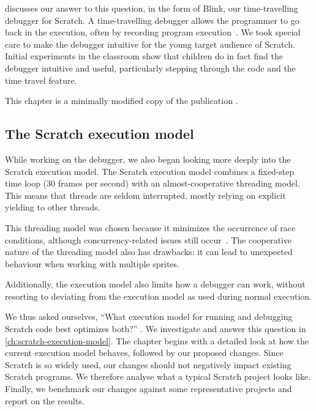 \documentclass[../main]{subfiles}
\begin{document}
 discusses our answer to this question, in the form of Blink, our time-travelling debugger for Scratch.
A time-travelling debugger allows the programmer to go back in the execution, often by recording program execution~\autocite{barrTardisAffordableTimetravel2014,barrTimetravelDebuggingJavaScript2016,czaplickiAsynchronousFunctionalReactive2013,balzerEXDAMSExtendableDebugging1969,ungarDebuggingExperienceImmediacy1997,chenReversibleDebuggingUsing2001,crescenziReversibleExecutionVisualization2000}.
We took special care to make the debugger intuitive for the young target audience of Scratch.
Initial experiments in the classroom show that children do in fact find the debugger intuitive and useful, particularly stepping through the code and the time travel feature.

This chapter is a minimally modified copy of the publication \textcite{strijbolBlinkEducationalSoftware2024}.

\subsection{The Scratch execution model}\label{subsec:the-scratch-execution-model}

While working on the debugger, we also began looking more deeply into the Scratch execution model.
The Scratch execution model combines a fixed-step time loop (30 frames per second) with an almost-cooperative threading model.
This means that threads are seldom interrupted, mostly relying on explicit yielding to other threads.

This threading model was chosen because it minimizes the occurrence of race conditions, although concurrency-related issues still occur~\autocite{maloneyScratchProgrammingLanguage2010}.
The cooperative nature of the threading model also has drawbacks: it can lead to unexpected behaviour when working with multiple sprites.

Additionally, the execution model also limits how a debugger can work, without resorting to deviating from the execution model as used during normal execution.

We thus asked ourselves, ``What execution model for running and debugging Scratch code best optimizes both?'' .
We investigate and answer this question in \cref{ch:scratch-execution-model}.
The chapter begins with a detailed look at how the current execution model behaves, followed by our proposed changes.
Since Scratch is so widely used, our changes should not negatively impact existing Scratch programs.
We therefore analyse what a typical Scratch project looks like.
Finally, we benchmark our changes against some representative projects and report on the results.
\end{document}
